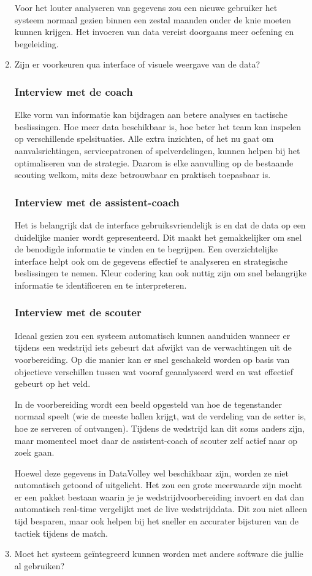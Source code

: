 \begin{enumerate}
  Voor het louter analyseren van gegevens zou een nieuwe gebruiker het systeem normaal gezien binnen een zestal maanden onder de knie moeten kunnen krijgen. Het invoeren van data vereist doorgaans meer oefening en begeleiding.
  \item Zijn er voorkeuren qua interface of visuele weergave van de data?
  \subsubsection{Interview met de coach}
  Elke vorm van informatie kan bijdragen aan betere analyses en tactische beslissingen. Hoe meer data beschikbaar is, hoe beter het team kan inspelen op verschillende spelsituaties. Alle extra inzichten, of het nu gaat om aanvalsrichtingen, servicepatronen of spelverdelingen, kunnen helpen bij het optimaliseren van de strategie. Daarom is elke aanvulling op de bestaande scouting welkom, mits deze betrouwbaar en praktisch toepasbaar is.
  \subsubsection{Interview met de assistent-coach}
  Het is belangrijk dat de interface gebruiksvriendelijk is en dat de data op een duidelijke manier wordt gepresenteerd. Dit maakt het gemakkelijker om snel de benodigde informatie te vinden en te begrijpen. Een overzichtelijke interface helpt ook om de gegevens effectief te analyseren en strategische beslissingen te nemen. Kleur codering kan ook nuttig zijn om snel belangrijke informatie te identificeren en te interpreteren.
  \subsubsection{Interview met de scouter}
  Ideaal gezien zou een systeem automatisch kunnen aanduiden wanneer er tijdens een wedstrijd iets gebeurt dat afwijkt van de verwachtingen uit de voorbereiding. Op die manier kan er snel geschakeld worden op basis van objectieve verschillen tussen wat vooraf geanalyseerd werd en wat effectief gebeurt op het veld.

  In de voorbereiding wordt een beeld opgesteld van hoe de tegenstander normaal speelt (wie de meeste ballen krijgt, wat de verdeling van de setter is, hoe ze serveren of ontvangen). Tijdens de wedstrijd kan dit soms anders zijn, maar momenteel moet daar de assistent-coach of scouter zelf actief naar op zoek gaan.

  Hoewel deze gegevens in DataVolley wel beschikbaar zijn, worden ze niet automatisch getoond of uitgelicht. Het zou een grote meerwaarde zijn mocht er een pakket bestaan waarin je je wedstrijdvoorbereiding invoert en dat dan automatisch real-time vergelijkt met de live wedstrijddata. Dit zou niet alleen tijd besparen, maar ook helpen bij het sneller en accurater bijsturen van de tactiek tijdens de match.
  \item Moet het systeem geïntegreerd kunnen worden met andere software die jullie al gebruiken?

\end{enumerate}
